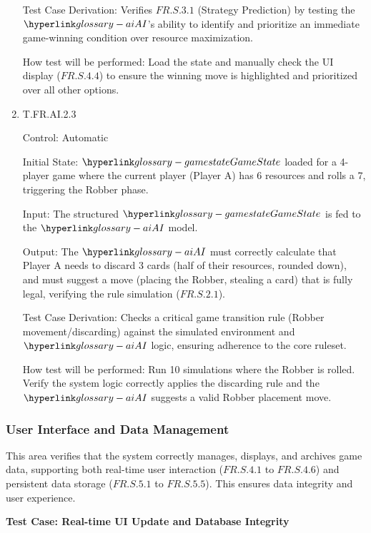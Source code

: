 \documentclass[12pt, titlepage]{article}
\begin{document}
\begin{enumerate}
Test Case Derivation: Verifies $\hyperref[FR.S.3.1]{FR.S.3.1}$ (Strategy Prediction) by testing the $\AI{}$'s ability to identify and prioritize an immediate game-winning condition over resource maximization.

How test will be performed: Load the state and manually check the UI display ($\hyperref[FR.S.4.4]{FR.S.4.4}$) to ensure the winning move is highlighted and prioritized over all other options.

\item{T.FR.AI.2.3\\}

Control: Automatic

Initial State: $\GameState{}$ loaded for a 4-player game where the current player (Player A) has 6 resources and rolls a 7, triggering the Robber phase.

Input: The structured $\GameState{}$ is fed to the $\AI{}$ model.

Output: The $\AI{}$ must correctly calculate that Player A needs to discard 3 cards (half of their resources, rounded down), and must suggest a move (placing the Robber, stealing a card) that is fully legal, verifying the rule simulation ($\hyperref[FR.S.2.1]{FR.S.2.1}$).

Test Case Derivation: Checks a critical game transition rule (Robber movement/discarding) against the simulated environment and $\AI{}$ logic, ensuring adherence to the core ruleset.

How test will be performed: Run 10 simulations where the Robber is rolled.
Verify the system logic correctly applies the discarding rule and the $\AI{}$ suggests a valid Robber placement move.
\end{enumerate}

\subsubsection{User Interface and Data Management}

This area verifies that the system correctly manages, displays, and archives game data, supporting both real-time user interaction ($\hyperref[FR.S.4.1]{FR.S.4.1}$ to $\hyperref[FR.S.4.6]{FR.S.4.6}$) and persistent data storage ($\hyperref[FR.S.5.1]{FR.S.5.1}$ to $\hyperref[FR.S.5.5]{FR.S.5.5}$). This ensures data integrity and user experience.

\textbf{Test Case: Real-time UI Update and Database Integrity}
\end{document}
